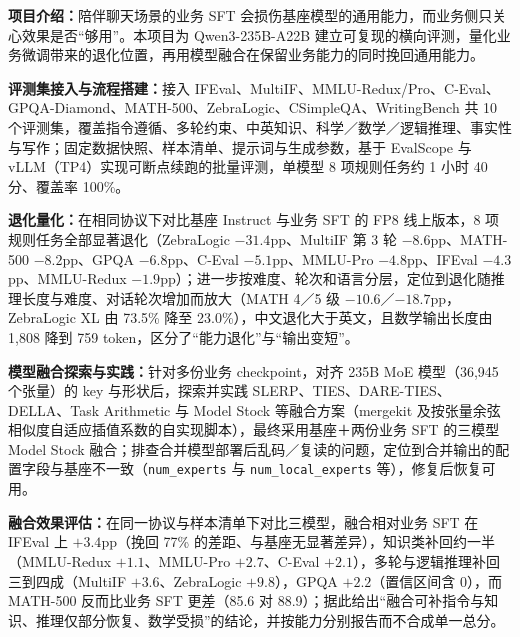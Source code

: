 
\textbf{项目介绍：}陪伴聊天场景的业务 SFT 会损伤基座模型的通用能力，而业务侧只关心效果是否“够用”。本项目为 Qwen3-235B-A22B 建立可复现的横向评测，量化业务微调带来的退化位置，再用模型融合在保留业务能力的同时挽回通用能力。\par
\begin{experienceitems}
  \item \textbf{评测集接入与流程搭建：}接入 IFEval、MultiIF、MMLU-Redux/Pro、C-Eval、GPQA-Diamond、MATH-500、ZebraLogic、CSimpleQA、WritingBench 共 10 个评测集，覆盖指令遵循、多轮约束、中英知识、科学／数学／逻辑推理、事实性与写作；固定数据快照、样本清单、提示词与生成参数，基于 EvalScope 与 vLLM（TP4）实现可断点续跑的批量评测，单模型 8 项规则任务约 1 小时 40 分、覆盖率 100\%。
  \item \textbf{退化量化：}在相同协议下对比基座 Instruct 与业务 SFT 的 FP8 线上版本，8 项规则任务全部显著退化（ZebraLogic $-31.4$pp、MultiIF 第 3 轮 $-8.6$pp、MATH-500 $-8.2$pp、GPQA $-6.8$pp、C-Eval $-5.1$pp、MMLU-Pro $-4.8$pp、IFEval $-4.3$pp、MMLU-Redux $-1.9$pp）；进一步按难度、轮次和语言分层，定位到退化随推理长度与难度、对话轮次增加而放大（MATH 4／5 级 $-10.6$／$-18.7$pp，ZebraLogic XL 由 73.5\% 降至 23.0\%），中文退化大于英文，且数学输出长度由 1,808 降到 759 token，区分了“能力退化”与“输出变短”。
  \item \textbf{模型融合探索与实践：}针对多份业务 checkpoint，对齐 235B MoE 模型（36,945 个张量）的 key 与形状后，探索并实践 SLERP、TIES、DARE-TIES、DELLA、Task Arithmetic 与 Model Stock 等融合方案（mergekit 及按张量余弦相似度自适应插值系数的自实现脚本），最终采用基座＋两份业务 SFT 的三模型 Model Stock 融合；排查合并模型部署后乱码／复读的问题，定位到合并输出的配置字段与基座不一致（\texttt{num\_experts} 与 \texttt{num\_local\_experts} 等），修复后恢复可用。
  \item \textbf{融合效果评估：}在同一协议与样本清单下对比三模型，融合相对业务 SFT 在 IFEval 上 $+3.4$pp（挽回 77\% 的差距、与基座无显著差异），知识类补回约一半（MMLU-Redux $+1.1$、MMLU-Pro $+2.7$、C-Eval $+2.1$），多轮与逻辑推理补回三到四成（MultiIF $+3.6$、ZebraLogic $+9.8$），GPQA $+2.2$（置信区间含 0），而 MATH-500 反而比业务 SFT 更差（85.6 对 88.9）；据此给出“融合可补指令与知识、推理仅部分恢复、数学受损”的结论，并按能力分别报告而不合成单一总分。
\end{experienceitems}
